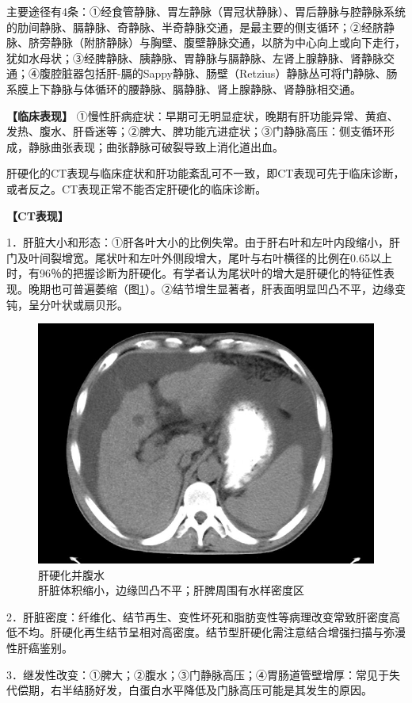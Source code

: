 主要途径有4条：①经食管静脉、胃左静脉（胃冠状静脉）、胃后静脉与腔静脉系统的肋间静脉、膈静脉、奇静脉、半奇静脉交通，是最主要的侧支循环；②经脐静脉、脐旁静脉（附脐静脉）与胸壁、腹壁静脉交通，以脐为中心向上或向下走行，犹如水母状；③经脾静脉、胰静脉、胃静脉与膈静脉、左肾上腺静脉、肾静脉交通；④腹腔脏器包括肝-膈的Sappy静脉、肠壁（Retzius）静脉丛可将门静脉、肠系膜上下静脉与体循环的腰静脉、膈静脉、肾上腺静脉、肾静脉相交通。

\textbf{【临床表现】}
①慢性肝病症状：早期可无明显症状，晚期有肝功能异常、黄疸、发热、腹水、肝昏迷等；②脾大、脾功能亢进症状；③门静脉高压：侧支循环形成，静脉曲张表现；曲张静脉可破裂导致上消化道出血。

肝硬化的CT表现与临床症状和肝功能紊乱可不一致，即CT表现可先于临床诊断，或者反之。CT表现正常不能否定肝硬化的临床诊断。

\textbf{【CT表现】}

1．肝脏大小和形态：①肝各叶大小的比例失常。由于肝右叶和左叶内段缩小，肝门及叶间裂增宽。尾状叶和左叶外侧段增大，尾叶与右叶横径的比例在0.65以上时，有96％的把握诊断为肝硬化。有学者认为尾状叶的增大是肝硬化的特征性表现。晚期也可普遍萎缩（图\ref{fig11-13}）。②结节增生显著者，肝表面明显凹凸不平，边缘变钝，呈分叶状或扇贝形。

\begin{figure}[!htbp]
 \centering
 \includegraphics[width=.7\textwidth,height=\textheight,keepaspectratio]{./images/Image00285.jpg}
 \captionsetup{justification=centering}
 \caption{肝硬化并腹水\\{\small 肝脏体积缩小，边缘凹凸不平；肝脾周围有水样密度区}}
 \label{fig11-13}
  \end{figure} 

2．肝脏密度：纤维化、结节再生、变性坏死和脂肪变性等病理改变常致肝密度高低不均。肝硬化再生结节呈相对高密度。结节型肝硬化需注意结合增强扫描与弥漫性肝癌鉴别。

3．继发性改变：①脾大；②腹水；③门静脉高压；④胃肠道管壁增厚：常见于失代偿期，右半结肠好发，白蛋白水平降低及门脉高压可能是其发生的原因。

